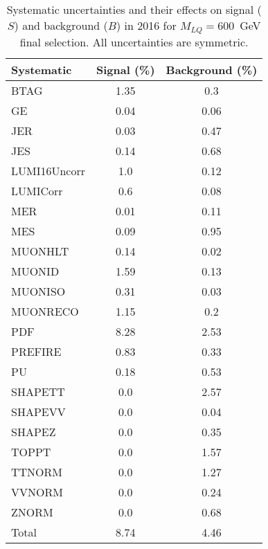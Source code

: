\begin{table}[htbp]
\begin{center}
\caption{Systematic uncertainties and their effects on signal ($S$) and background ($B$) in 2016 for $M_{LQ}=600$~GeV final selection. All uncertainties are symmetric.}
\begin{tabular}{lcc}
\hline\hline
Systematic & Signal (\%) & Background (\%) \\ \hline 
BTAG & 1.35 & 0.3\\ 
GE & 0.04 & 0.06\\ 
JER & 0.03 & 0.47\\ 
JES & 0.14 & 0.68\\ 
LUMI16Uncorr & 1.0 & 0.12\\ 
LUMICorr & 0.6 & 0.08\\ 
MER & 0.01 & 0.11\\ 
MES & 0.09 & 0.95\\ 
MUONHLT & 0.14 & 0.02\\ 
MUONID & 1.59 & 0.13\\ 
MUONISO & 0.31 & 0.03\\ 
MUONRECO & 1.15 & 0.2\\ 
PDF & 8.28 & 2.53\\ 
PREFIRE & 0.83 & 0.33\\ 
PU & 0.18 & 0.53\\ 
SHAPETT & 0.0 & 2.57\\ 
SHAPEVV & 0.0 & 0.04\\ 
SHAPEZ & 0.0 & 0.35\\ 
TOPPT & 0.0 & 1.57\\ 
TTNORM & 0.0 & 1.27\\ 
VVNORM & 0.0 & 0.24\\ 
ZNORM & 0.0 & 0.68\\ 
Total & 8.74 & 4.46\\ \hline \hline
\end{tabular}
\label{tab:SysUncertainties_uujj_600}
\end{center}
\end{table}

